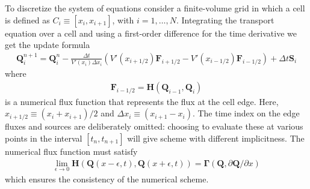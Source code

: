 \documentclass[11pt]{amsart}
\newcommand{\pfracb}[2]{\partial #1/\partial #2}
\newcommand{\mvec}[1]{\mathbf{#1}}
\begin{document}
To discretize the system of equations consider a finite-volume grid in
which a cell is defined as $C_i \equiv [x_i, x_{i+1}]$, with
$i=1,\ldots,N$. Integrating the transport equation over a
cell and using a first-order difference for the time derivative we get
the update formula
\begin{align}
  \mvec{Q}_i^{n+1} = \mvec{Q}^n_i - \frac{\Delta t}{V'(x_i) \Delta x_i}
  \left (
    V'(x_{i+1/2}) \mvec{F}_{i+1/2} - 
    V'(x_{i-1/2}) \mvec{F}_{i-1/2}
  \right)
  +
  \Delta t \mvec{S}_i \label{eqn:update-form}
\end{align}
where
\begin{align}
  \mvec{F}_{i-1/2} = 
  \mvec{H}(
  \mvec{Q}_{i-1},
  \mvec{Q}_i
  ) \label{eqn:flux-func}
\end{align}
is a numerical flux function that represents the flux at the cell
edge. Here, $x_{i+1/2} \equiv (x_i+x_{i+1})/2$ and $\Delta x_i \equiv
(x_{i+1}-x_i)$. The time index on the edge fluxes and sources are
deliberately omitted: choosing to evaluate these at various points in
the interval $[t_n,t_{n+1}]$ will give scheme with different
implicitness. The numerical flux function must satisfy
\begin{align}
  \lim_{\epsilon\rightarrow 0} \mvec{H}
  \left(
    \mvec{Q}(x-\epsilon,t),
    \mvec{Q}(x+\epsilon,t)
  \right)
  =
  \mvec{\Gamma}(\mvec{Q},\pfracb{\mvec{Q}}{x})
\end{align}
which ensures the consistency of the numerical scheme.
\end{document}
